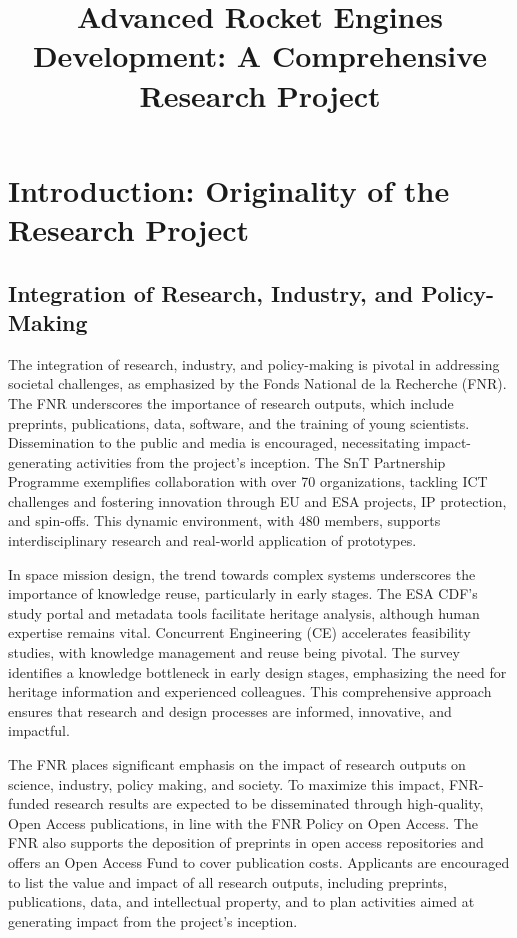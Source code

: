 \documentclass[12pt]{article}
\title{Advanced Rocket Engines Development: A Comprehensive Research Project}
\author{}
\date{}
\begin{document}
\maketitle

\section{Introduction: Originality of the Research Project}

\subsection{Integration of Research, Industry, and Policy-Making}

The integration of research, industry, and policy-making is pivotal in addressing societal challenges, as emphasized by the Fonds National de la Recherche (FNR). The FNR underscores the importance of research outputs, which include preprints, publications, data, software, and the training of young scientists. Dissemination to the public and media is encouraged, necessitating impact-generating activities from the project's inception. The SnT Partnership Programme exemplifies collaboration with over 70 organizations, tackling ICT challenges and fostering innovation through EU and ESA projects, IP protection, and spin-offs. This dynamic environment, with 480 members, supports interdisciplinary research and real-world application of prototypes.

In space mission design, the trend towards complex systems underscores the importance of knowledge reuse, particularly in early stages. The ESA CDF's study portal and metadata tools facilitate heritage analysis, although human expertise remains vital. Concurrent Engineering (CE) accelerates feasibility studies, with knowledge management and reuse being pivotal. The survey identifies a knowledge bottleneck in early design stages, emphasizing the need for heritage information and experienced colleagues. This comprehensive approach ensures that research and design processes are informed, innovative, and impactful.

The FNR places significant emphasis on the impact of research outputs on science, industry, policy making, and society. To maximize this impact, FNR-funded research results are expected to be disseminated through high-quality, Open Access publications, in line with the FNR Policy on Open Access. The FNR also supports the deposition of preprints in open access repositories and offers an Open Access Fund to cover publication costs. Applicants are encouraged to list the value and impact of all research outputs, including preprints, publications, data, and intellectual property, and to plan activities aimed at generating impact from the project's inception.
\end{document}
